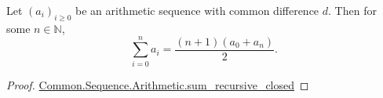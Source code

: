 \documentclass{article}
\begin{document}
\begin{theorem}

Let $(a_i)_{i \geq 0}$ be an arithmetic sequence with common difference $d$.
Then for some $n \in \mathbb{N}$,
$$\sum_{i=0}^n a_i = \frac{(n + 1)(a_0 + a_n)}{2}.$$

\end{theorem}

\begin{proof}

\href{Arithmetic.lean}{Common.Sequence.Arithmetic.sum_recursive_closed}

\end{proof}
\end{document}
